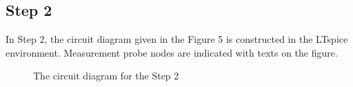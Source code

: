 \documentclass[letterpaper,12pt]{article}
\begin{document}
\subsection{Step 2}
In Step 2, the circuit diagram given in the Figure 5 is constructed in the LTspice environment. Measurement probe nodes are indicated with texts on the figure.
\begin{figure}[H] 
	\caption{The circuit diagram for the Step 2}
\end{figure}
\end{document}
